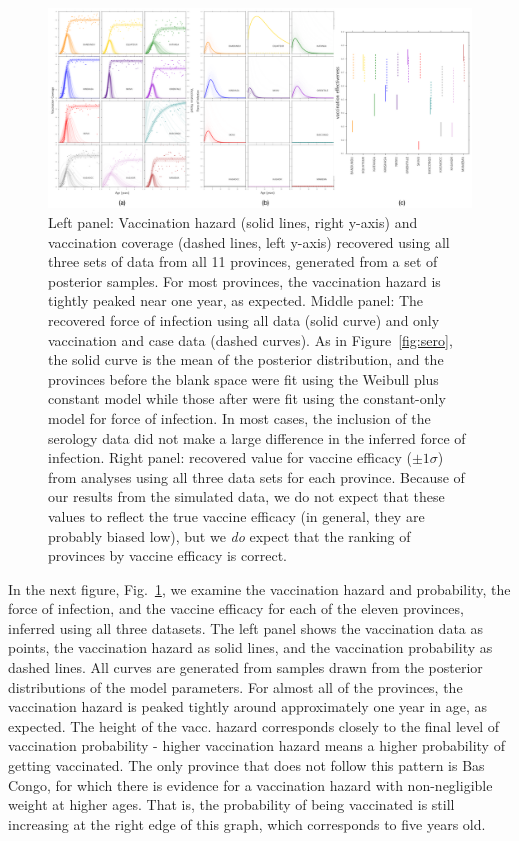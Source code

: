 \documentclass[nofootinbib,aps,pre,twocolumn,superscriptaddress,showkeys,showpacs]{revtex4-1}
\begin{document}
\begin{figure}
\includegraphics[width=\textwidth,angle=0]{figures/VacFOIveff-crop.pdf}
\caption{\label{fig:foivaccveff} Left panel: Vaccination hazard (solid lines, right y-axis) and vaccination coverage (dashed lines, left y-axis) recovered using all three sets of data from all 11 provinces, generated from a set of posterior samples. For most provinces, the vaccination hazard is tightly peaked near one year, as expected. Middle panel: The recovered force of infection using all data (solid curve) and only vaccination and case data (dashed curves). As in Figure~\ref{fig:sero}, the solid curve is the mean of the posterior distribution, and the provinces before the blank space were fit using the Weibull plus constant model while those after were fit using the constant-only model for force of infection. In most cases, the inclusion of the serology data did not make a large difference in the inferred force of infection. Right panel: recovered value for vaccine efficacy ($\pm 1\sigma$) from analyses using all three data sets for each province. Because of our results from the simulated data, we do not expect that these values to reflect the true vaccine efficacy (in general, they are probably biased low), but we \emph{do} expect that the ranking of provinces by vaccine efficacy is correct.}
\end{figure}

In the next figure, Fig.~\ref{fig:foivaccveff}, we examine the vaccination hazard and probability, the force of infection, and the vaccine efficacy for each of the eleven provinces, inferred using all three datasets. The left panel shows the vaccination data as points, the vaccination hazard as solid lines, and the vaccination probability as dashed lines. All curves are generated from samples drawn from the posterior distributions of the model parameters. For almost all of the provinces, the vaccination hazard is peaked tightly around approximately one year in age, as expected. The height of the vacc. hazard corresponds closely to the final level of vaccination probability - higher vaccination hazard means a higher probability of getting vaccinated. The only province that does not follow this pattern is Bas Congo, for which there is evidence for a vaccination hazard with non-negligible weight at higher ages. That is, the probability of being vaccinated is still increasing at the right edge of this graph, which corresponds to five years old.
\end{document}
